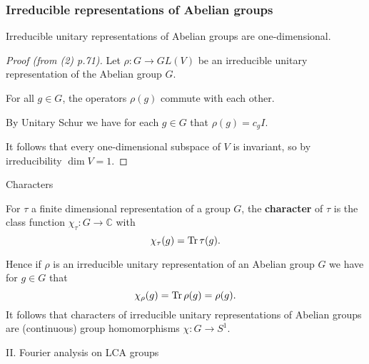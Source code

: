 \documentclass[mathserif
, handout
]{beamer}
\begin{document}
\begin{frame}
    \frametitle{Irreducible representations of Abelian groups}
    \begin{Corollary}
        Irreducible unitary representations of Abelian groups are one-dimensional.
    \end{Corollary}
    \pause

    \begin{proof}[Proof (from (2) p.71)]
        Let $\rho\colon G\to GL(V)$ be an irreducible unitary representation of the Abelian group $G$. \pause 
        
        For all $g\in G$, the operators $\rho(g)$ commute with each other. \pause 
        
        By Unitary Schur we have for each $g\in G$ that $\rho(g) = c_gI$. \pause

        It follows that every one-dimensional subspace of $V$ is invariant, so by irreducibility $\dim V = 1$.
    \end{proof} %
\end{frame}

\begin{frame}{Characters}
    \begin{definition}
        For $\tau$ a finite dimensional representation of a group $G$, the \textbf{character} of $\tau$ is the class function $\chi_\tau\colon G\to \mathbb{C}$ with \[\chi_\tau(g) = \Tr \tau(g).\]
    \end{definition}
    \pause

    Hence if $\rho$ is an irreducible unitary representation of an Abelian group $G$ we have for $g\in G$ that \[\chi_\rho(g) = \Tr \rho(g) = \rho(g).\]
    \pause
    It follows that characters of irreducible unitary representations of Abelian groups are (continuous) group homomorphisms $\chi\colon G\to S^1$.
\end{frame}

\begin{frame}{}
    \begin{block}{}{
        \begin{center}\Large II. Fourier analysis on LCA groups\end{center}}
    \end{block}
\end{frame}
\end{document}
